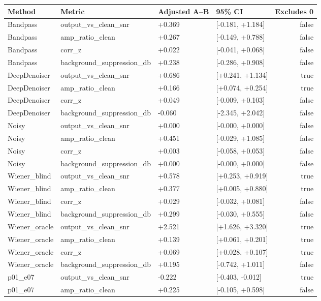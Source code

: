 \begin{tabular}{llllr}
\toprule
Method & Metric & Adjusted A--B & 95\% CI & Excludes 0 \\
\midrule
Bandpass & output\_vs\_clean\_snr & +0.369 & [-0.181, +1.184] & false \\
Bandpass & amp\_ratio\_clean & +0.267 & [-0.149, +0.788] & false \\
Bandpass & corr\_z & +0.022 & [-0.041, +0.068] & false \\
Bandpass & background\_suppression\_db & +0.238 & [-0.286, +0.908] & false \\
DeepDenoiser & output\_vs\_clean\_snr & +0.686 & [+0.241, +1.134] & true \\
DeepDenoiser & amp\_ratio\_clean & +0.166 & [+0.074, +0.254] & true \\
DeepDenoiser & corr\_z & +0.049 & [-0.009, +0.103] & false \\
DeepDenoiser & background\_suppression\_db & -0.060 & [-2.345, +2.042] & false \\
Noisy & output\_vs\_clean\_snr & +0.000 & [-0.000, +0.000] & false \\
Noisy & amp\_ratio\_clean & +0.451 & [-0.029, +1.085] & false \\
Noisy & corr\_z & +0.003 & [-0.058, +0.053] & false \\
Noisy & background\_suppression\_db & +0.000 & [-0.000, +0.000] & false \\
Wiener\_blind & output\_vs\_clean\_snr & +0.578 & [+0.253, +0.919] & true \\
Wiener\_blind & amp\_ratio\_clean & +0.377 & [+0.005, +0.880] & true \\
Wiener\_blind & corr\_z & +0.029 & [-0.032, +0.081] & false \\
Wiener\_blind & background\_suppression\_db & +0.299 & [-0.030, +0.555] & false \\
Wiener\_oracle & output\_vs\_clean\_snr & +2.521 & [+1.626, +3.320] & true \\
Wiener\_oracle & amp\_ratio\_clean & +0.139 & [+0.061, +0.201] & true \\
Wiener\_oracle & corr\_z & +0.069 & [+0.028, +0.107] & true \\
Wiener\_oracle & background\_suppression\_db & +0.195 & [-0.742, +1.011] & false \\
p01\_e07 & output\_vs\_clean\_snr & -0.222 & [-0.403, -0.012] & true \\
p01\_e07 & amp\_ratio\_clean & +0.225 & [-0.105, +0.598] & false \\

\end{tabular}

